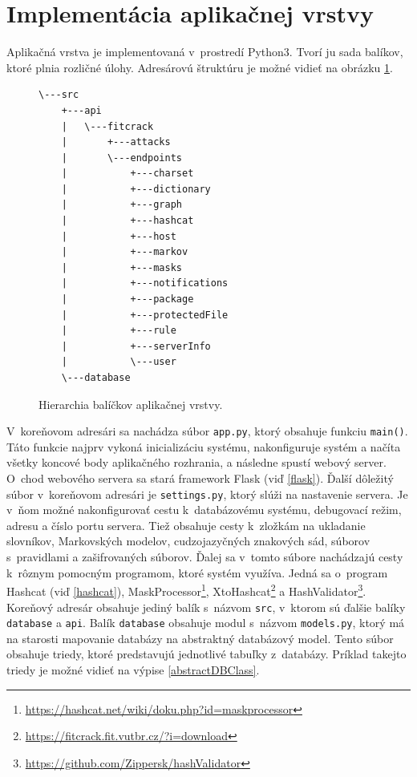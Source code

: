 \documentclass[slovak]{fitthesis}
\begin{document}
\section{Implementácia aplikačnej vrstvy}
Aplikačná vrstva je implementovaná v~prostredí Python3. Tvorí ju sada balíkov, ktoré plnia rozličné úlohy. Adresárovú štruktúru je možné vidieť na obrázku \ref{fig:serverStructure}.
\begin{figure}[H]
\begin{center}
\begin{varwidth}{\linewidth}
\begin{verbatim}
\---src
    +---api
    |   \---fitcrack
    |       +---attacks
    |       \---endpoints
    |           +---charset
    |           +---dictionary
    |           +---graph
    |           +---hashcat
    |           +---host
    |           +---markov
    |           +---masks
    |           +---notifications
    |           +---package
    |           +---protectedFile
    |           +---rule
    |           +---serverInfo
    |           \---user
    \---database
\end{verbatim}
\end{varwidth}
\end{center}
\caption{Hierarchia balíčkov aplikačnej vrstvy.}
\label{fig:serverStructure}
\end{figure}
V~koreňovom adresári sa nachádza súbor \texttt{app.py}, ktorý obsahuje funkciu \texttt{main()}. Táto funkcie najprv vykoná inicializáciu systému, nakonfiguruje systém a načíta všetky koncové body aplikačného rozhrania, a následne spustí webový server. O~chod webového servera sa stará framework Flask (viď \ref{flask}). Ďalší dôležitý súbor v~koreňovom adresári je \texttt{settings.py}, ktorý slúži na nastavenie servera. Je v~ňom možné nakonfigurovať cestu k~databázovému systému, debugovací režim, adresu a číslo portu servera. Tiež obsahuje cesty k~zložkám na ukladanie slovníkov, Markovských modelov, cudzojazyčných znakových sád, súborov s~pravidlami a zašifrovaných súborov. Ďalej sa v~tomto súbore nachádzajú cesty k~rôznym pomocným programom, ktoré systém využíva. Jedná sa o~program Hashcat (viď \ref{hashcat}), MaskProcessor\footnote{\url{https://hashcat.net/wiki/doku.php?id=maskprocessor}}, XtoHashcat\footnote{\url{https://fitcrack.fit.vutbr.cz/?i=download}} a HashValidator\footnote{\url{https://github.com/Zippersk/hashValidator}}. Koreňový adresár obsahuje jediný balík s~názvom \texttt{src}, v~ktorom sú ďalšie balíky \texttt{database} a \texttt{api}. Balík \texttt{database} obsahuje modul s~názvom \texttt{models.py}, ktorý má na starosti mapovanie databázy na abstraktný databázový model. Tento súbor obsahuje triedy, ktoré predstavujú jednotlivé tabuľky z~databázy. Príklad takejto triedy je možné vidieť na výpise \ref{abstractDBClass}. 
\end{document}
